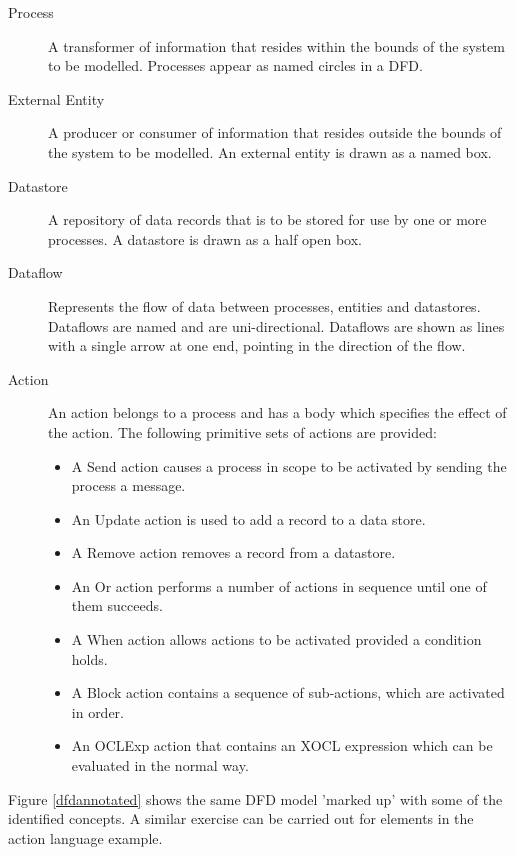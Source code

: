 \begin{description}
\item [Process]  A transformer of information that resides within the bounds of the system to be modelled. Processes appear as named circles in a DFD.

\item [External Entity] A producer or consumer of information that resides outside the bounds of the system to be modelled. An external entity is drawn as a named box.

\item [Datastore] A repository of data records that is to be stored for use by one or more processes. A datastore is drawn as a half open box.

\item [Dataflow] Represents the flow of data between processes, entities and datastores. Dataflows are named and are uni-directional. Dataflows are shown as lines with a single arrow at one end, pointing in the direction of the flow.

\item [Action] An action belongs to a process and has a body which specifies the effect of the action. The following primitive sets of actions are provided: 
\begin{itemize}
\item A Send action causes a process in scope to be activated by sending the process a message.
\item An Update action is used to add a record to a data store.
\item A Remove action removes a record from a datastore.
\item An Or action performs a number of actions in sequence until one of them succeeds. 
\item A When action allows actions to be activated provided a condition holds.
\item A Block action contains a sequence of sub-actions, which are activated in order.
\item An OCLExp action that contains an XOCL expression which can be evaluated in the normal way.
\end{itemize}

\end{description}

Figure \ref{dfdannotated} shows the same DFD model 'marked up' with some of the identified concepts. A similar exercise can be carried out for elements in the action language example.

